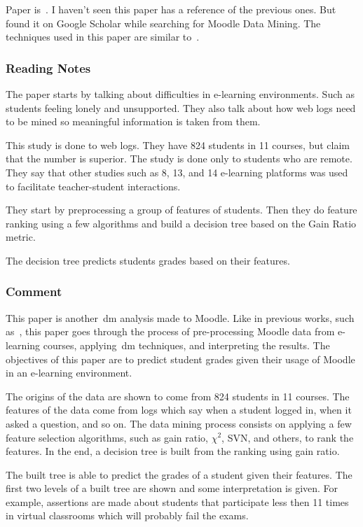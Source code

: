 Paper is~\cite{ind_005}. I haven't seen this paper has a reference of the
previous ones. But found it on Google Scholar while searching for Moodle Data
Mining. The techniques used in this paper are similar to~\cite{ind_002,
ind_004}.

\subsubsection{Reading Notes}

The paper starts by talking about difficulties in e-learning environments. Such
as students feeling lonely and unsupported. They also talk about how web logs
need to be mined so meaningful information is taken from them.

This study is done to web logs. They have 824 students in 11 courses, but claim
that the number is superior. The study is done only to students who are remote.
They say that other studies such as 8, 13, and 14 e-learning platforms was used
to facilitate teacher-student interactions.

They start by preprocessing a group of features of students. Then they do
feature ranking using a few algorithms and build a decision tree based on the
Gain Ratio metric.

The decision tree predicts students grades based on their features.

\subsubsection{Comment}

This paper is another~\gls{dm} analysis made to Moodle. Like in previous works,
such as~\cite{ind_002, ind_004}, this paper goes through the process of
pre-processing Moodle data from e-learning courses, applying~\gls{dm}
techniques, and interpreting the results. The objectives of this paper are to
predict student grades given their usage of Moodle in an e-learning
environment.

The origins of the data are shown to come from 824 students in 11 courses. The
features of the data come from logs which say when a student logged in, when it
asked a question, and so on. The data mining process consists on applying a few
feature selection algorithms, such as gain ratio, $ \chi^2 $, SVN, and others,
to rank the features. In the end, a decision tree is built from the ranking
using gain ratio.

The built tree is able to predict the grades of a student given their features.
The first two levels of a built tree are shown and some interpretation is
given. For example, assertions are made about students that participate less
then 11 times in virtual classrooms which will probably fail the exams.

